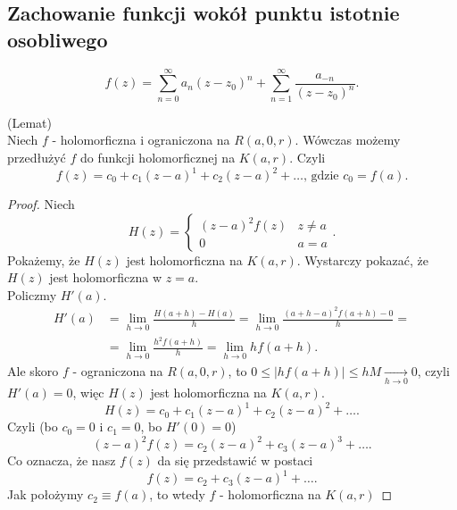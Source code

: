 \documentclass[../main.tex]{subfiles}
\begin{document}
\subsection{Zachowanie funkcji wokół punktu istotnie osobliwego}
\[
    f(z) = \sum_{n=0}^{\infty} a_n(z-z_0)^n + \sum_{n=1}^{\infty} \frac{a_{-n}}{(z-z_0)^n}
.\]
\begin{tw}
    (Lemat)\\
    Niech $f$ - holomorficzna i ograniczona na $R(a,0,r)$. Wówczas możemy przedłużyć $f$ do funkcji holomorficznej na $K(a,r)$. Czyli
    \[
        f(z) = c_0 + c_1(z-a)^1 + c_2(z-a)^2 + \ldots\text{, gdzie } c_0 = f(a)
    .\]
\end{tw}
\begin{proof}
    Niech
    \[H(z) = \begin{cases}
        (z-a)^2f(z)& z\neq a\\ 0 & a = a
    \end{cases}
    .\]
    Pokażemy, że $H(z)$ jest holomorficzna na $K(a,r)$. Wystarczy pokazać, że $H(z)$ jest holomorficzna w $z = a$. \\
    Policzmy $H'(a)$.
    \begin{align*}
        H'(a) &= \lim\limits_{h\to 0}\frac{H(a+h) - H(a)}{h} = \lim\limits_{h\to 0}\frac{(a+h-a)^2f(a+h) - 0}{h} =\\
        &= \lim\limits_{h\to 0}\frac{h^2f(a+h)}{h} = \lim\limits_{h\to 0} hf(a+h)
    .\end{align*}
Ale skoro $f$ - ograniczona na $R(a,0,r)$, to $0 \le \left| h f(a+h) \right| \le h M \underset{h\to 0}{\longrightarrow} 0$, czyli $H'(a) = 0$, więc $H(z)$ jest holomorficzna na $K(a,r)$.
\[
    H(z) = c_0 + c_1(z-a)^1 + c_2(z-a)^2 + \ldots
.\]
Czyli (bo $c_0 = 0$ i $c_1 = 0$, bo $H'(0) = 0$)
\[
    (z-a)^2f(z) = c_2(z-a)^2 + c_3(z-a)^3 + \ldots
.\]
Co oznacza, że nasz $f(z)$ da się przedstawić w postaci
\[
    f(z) = c_2 + c_3(z-a)^1 + \ldots
.\]
Jak położymy $c_2 \equiv f(a)$, to wtedy $f$ - holomorficzna na $K(a,r)$
\end{proof}
\end{document}
